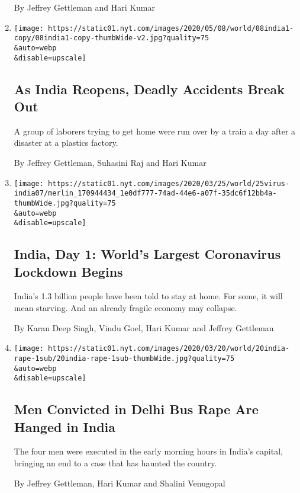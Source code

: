 \begin{enumerate}
  By Jeffrey Gettleman and Hari Kumar
\item
  \href{/2020/05/08/world/asia/india-leak-train-reopen.html}{}

  \texttt{[image: https://static01.nyt.com/images/2020/05/08/world/08india1-copy/08india1-copy-thumbWide-v2.jpg?quality=75\\\&auto=webp\\\&disable=upscale]}

  \hypertarget{as-india-reopens-deadly-accidents-break-out}{%
  \subsection{As India Reopens, Deadly Accidents Break
  Out}\label{as-india-reopens-deadly-accidents-break-out}}

  A group of laborers trying to get home were run over by a train a day
  after a disaster at a plastics factory.

  By Jeffrey Gettleman, Suhasini Raj and Hari Kumar
\item
  \href{/2020/03/25/world/asia/india-lockdown-coronavirus.html}{}

  \texttt{[image: https://static01.nyt.com/images/2020/03/25/world/25virus-india07/merlin\_170944434\_1e0df777-74ad-44e6-a07f-35dc6f12bb4a-thumbWide.jpg?quality=75\\\&auto=webp\\\&disable=upscale]}

  \hypertarget{india-day-1-worlds-largest-coronavirus-lockdown-begins}{%
  \subsection{India, Day 1: World's Largest Coronavirus Lockdown
  Begins}\label{india-day-1-worlds-largest-coronavirus-lockdown-begins}}

  India's 1.3 billion people have been told to stay at home. For some,
  it will mean starving. And an already fragile economy may collapse.

  By Karan Deep Singh, Vindu Goel, Hari Kumar and Jeffrey Gettleman
\item
  \href{/2020/03/19/world/asia/india-bus-rape-convicts-hanged.html}{}

  \texttt{[image: https://static01.nyt.com/images/2020/03/20/world/20india-rape-1sub/20india-rape-1sub-thumbWide.jpg?quality=75\\\&auto=webp\\\&disable=upscale]}

  \hypertarget{men-convicted-in-delhi-bus-rape-are-hanged-in-india}{%
  \subsection{Men Convicted in Delhi Bus Rape Are Hanged in
  India}\label{men-convicted-in-delhi-bus-rape-are-hanged-in-india}}

  The four men were executed in the early morning hours in India's
  capital, bringing an end to a case that has haunted the country.

  By Jeffrey Gettleman, Hari Kumar and Shalini Venugopal
\end{enumerate}

